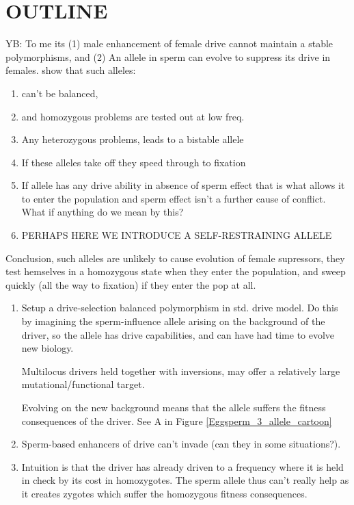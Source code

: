 \documentclass[12pt,letterpaper]{article}
\newcommand{\yb}[1]{{ \color{blue} #1}}
\begin{document}
\section*{OUTLINE}
\yb{YB: To me its (1) male enhancement of female drive cannot maintain a stable polymorphisms, and (2) An allele in sperm can evolve to suppress its drive in females.}
show that such alleles:
\begin{enumerate}
\item can't be balanced, \\
\item and homozygous problems are tested out at low freq.  \\
\item Any heterozygous problems, leads to a bistable allele\\
\item If these alleles take off they speed through to fixation\\
\item If allele has any drive ability in absence of sperm effect that is what allows it to enter the population
and sperm effect isn't a further cause of conflict. What if anything do we mean by this?\\
\item PERHAPS HERE WE INTRODUCE A SELF-RESTRAINING ALLELE
\end{enumerate}

Conclusion, such alleles are unlikely to cause evolution of female supressors, they test hemselves in a homozygous
state when they enter the population, and sweep quickly (all the way to fixation) if they enter the pop at all.\\


\begin{enumerate}
\item Setup a drive-selection balanced polymorphism in std. drive model. 
Do this by imagining the sperm-influence allele arising on the background of the driver, 
so the allele has drive capabilities, and can have had time to evolve new biology. 

Multilocus drivers held together with inversions, may offer a relatively large mutational/functional target.

Evolving on the new background means that the allele suffers the fitness consequences of the 
driver.  See A in Figure \ref{Eggsperm_3_allele_cartoon} \\
\item Sperm-based enhancers of drive can't invade (can they in some situations?). \\
\item Intuition is that the driver has already driven to a frequency 
where it is held in check by its cost in homozygotes. The sperm allele 
thus can't really help as it creates zygotes which suffer the homozygous fitness consequences.
\end{enumerate}
\end{document}
